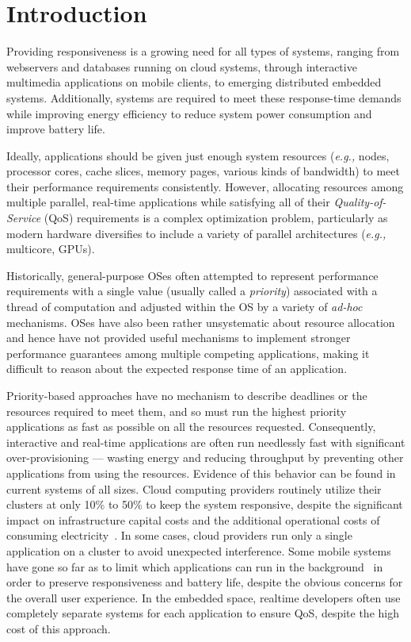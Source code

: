 \section{Introduction}

Providing responsiveness is a growing need for all types of systems,
ranging from webservers and databases running on cloud systems,
through interactive multimedia applications on mobile clients, to
emerging distributed embedded systems. Additionally, systems are
required to meet these response-time demands while improving energy
efficiency to reduce system power consumption and improve battery
life.

Ideally, applications should be given just enough system resources
(\emph{e.g.,}  nodes, processor cores, cache slices, memory pages,
various kinds of bandwidth) to meet their performance requirements
consistently.  However, allocating resources among multiple parallel,
real-time applications while satisfying all of their
\emph{Quality-of-Service} (QoS) requirements is a complex optimization
problem, particularly as modern hardware diversifies to include a
variety of parallel architectures (\emph{e.g.,} multicore, GPUs).

Historically, general-purpose OSes often attempted to represent performance
requirements with a single value (usually called a \emph{priority})
associated with a thread of computation and adjusted within the OS by
a variety of \emph{ad-hoc} mechanisms.  OSes have also been rather
unsystematic about resource allocation and hence have not provided
useful mechanisms to implement stronger performance guarantees among
multiple competing applications, making it difficult to reason about
the expected response time of an application.

Priority-based approaches have no mechanism to describe deadlines or
the resources required to meet them, and so must run the highest
priority applications as fast as possible on all the resources
requested.  Consequently, interactive and real-time applications are
often run needlessly fast with significant over-provisioning ---
wasting energy and reducing throughput by preventing other
applications from using the resources.  Evidence of this behavior can
be found in current systems of all sizes.  Cloud computing providers
routinely utilize their clusters at only 10\% to 50\% to keep the
system responsive, despite the significant impact on infrastructure
capital costs and the additional operational costs of consuming
electricity~\cite{Barroso2009,Hennessy2011}.  In some cases, cloud
providers run only a single application on a cluster to avoid
unexpected interference.  Some mobile systems have gone so far as to
limit which applications can run in the background~\cite{iOsDev} in
order to preserve responsiveness and battery life, despite the obvious
concerns for the overall user experience.  In the embedded space,
realtime developers often use completely separate systems for each
application to ensure QoS, despite the high cost of this approach.

